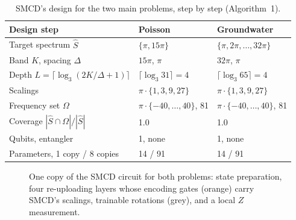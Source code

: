 \begin{table}[htbp]
  \centering
  \small
  \begin{tabular}{lll}
  \toprule
  Design step & Poisson & Groundwater \\
  \midrule
  Target spectrum $\hat S$ & $\{\pi, 15\pi\}$ & $\{\pi, 2\pi, \dots, 32\pi\}$ \\
  Band $K$, spacing $\Delta$ & $15\pi$, $\pi$ & $32\pi$, $\pi$ \\
  Depth $L=\lceil\log_3(2K/\Delta+1)\rceil$ & $\lceil\log_3 31\rceil=4$ & $\lceil\log_3 65\rceil=4$ \\
  Scalings & $\pi\cdot\{1,3,9,27\}$ & $\pi\cdot\{1,3,9,27\}$ \\
  Frequency set $\Omega$ & $\pi\cdot\{-40,\dots,40\}$, 81 & $\pi\cdot\{-40,\dots,40\}$, 81 \\
  Coverage $|\hat S\cap\Omega|/|\hat S|$ & 1.0 & 1.0 \\
  Qubits, entangler & 1, none & 1, none \\
  Parameters, 1 copy / 8 copies & 14 / 91 & 14 / 91 \\
  \bottomrule
  \end{tabular}
  \caption{SMCD's design for the two main problems, step by step (Algorithm~1).}
  \label{tab:design}
\end{table}

\begin{figure}[htbp]
\centering
{}
\caption{One copy of the SMCD circuit for both problems: state preparation, four
  re-uploading layers whose encoding gates (orange) carry SMCD's scalings, trainable
  rotations (grey), and a local $Z$ measurement.}
\label{fig:circuit}
\end{figure}
